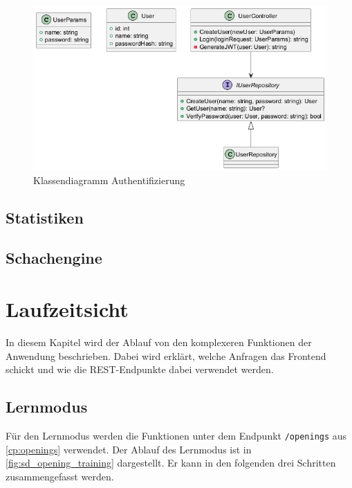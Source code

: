 \begin{figure}[h]
    \includegraphics[width=\linewidth]{images/diagrams/auth.png}
    \caption{Klassendiagramm Authentifizierung}
    \label{fig:cd_auth}
\end{figure}

\subsection{Statistiken}

\subsection{Schachengine}

\section{Laufzeitsicht}

In diesem Kapitel wird der Ablauf von den komplexeren Funktionen der Anwendung beschrieben. Dabei wird erklärt, welche Anfragen das Frontend schickt und wie die REST-Endpunkte dabei verwendet werden.

\subsection{Lernmodus}
Für den Lernmodus werden die Funktionen unter dem Endpunkt \lstinline{/openings} aus \autoref{cp:openings} verwendet.
Der Ablauf des Lernmodus ist in \autoref{fig:sd_opening_training} dargestellt. Er kann in den folgenden drei Schritten zusammengefasst werden.

